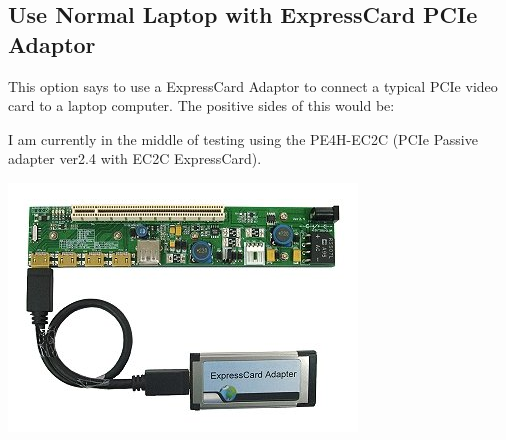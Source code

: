 \documentclass{article}
\begin{document}
\subsection{Use Normal Laptop with ExpressCard PCIe Adaptor}
This option says to use a ExpressCard Adaptor to connect a typical PCIe video card to a laptop computer.
The positive sides of this would be:

I am currently in the middle of testing using the PE4H-EC2C (PCIe Passive adapter ver2.4 with EC2C ExpressCard).

\begin{center}
\includegraphics[width=0.75\columnwidth]{./pix/expresscard.jpg}\\
\end{center}
\end{document}
